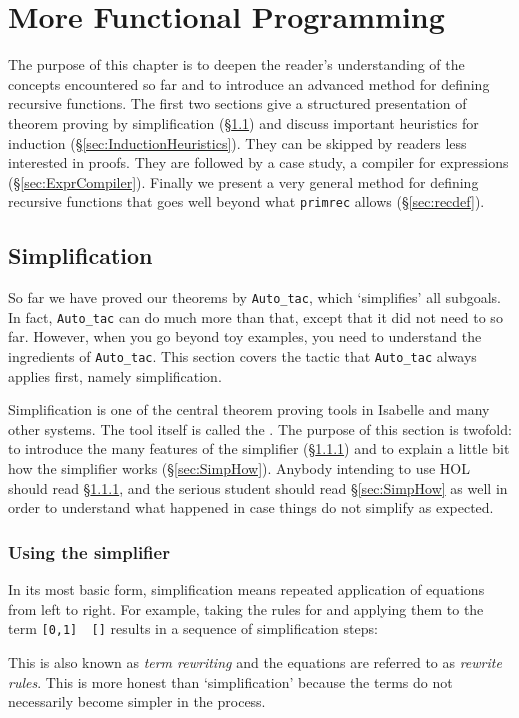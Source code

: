 \chapter{More Functional Programming}

The purpose of this chapter is to deepen the reader's understanding of the
concepts encountered so far and to introduce an advanced method for defining
recursive functions. The first two sections give a structured presentation of
theorem proving by simplification (\S\ref{sec:Simplification}) and
discuss important heuristics for induction (\S\ref{sec:InductionHeuristics}). They
can be skipped by readers less interested in proofs. They are followed by a
case study, a compiler for expressions (\S\ref{sec:ExprCompiler}).
Finally we present a very general method for defining recursive functions
that goes well beyond what \texttt{primrec} allows (\S\ref{sec:recdef}).


\section{Simplification}
\label{sec:Simplification}

So far we have proved our theorems by \texttt{Auto_tac}, which
`simplifies' all subgoals. In fact, \texttt{Auto_tac} can do much more than
that, except that it did not need to so far. However, when you go beyond toy
examples, you need to understand the ingredients of \texttt{Auto_tac}.
This section covers the tactic that \texttt{Auto_tac} always applies first,
namely simplification.

Simplification is one of the central theorem proving tools in Isabelle and
many other systems. The tool itself is called the . The
purpose of this section is twofold: to introduce the many features of the
simplifier (\S\ref{sec:SimpFeatures}) and to explain a little bit how the
simplifier works (\S\ref{sec:SimpHow}).  Anybody intending to use HOL should
read \S\ref{sec:SimpFeatures}, and the serious student should read
\S\ref{sec:SimpHow} as well in order to understand what happened in case
things do not simplify as expected.


\subsection{Using the simplifier}
\label{sec:SimpFeatures}

In its most basic form, simplification means repeated application of
equations from left to right. For example, taking the rules for \texttt{\at}
and applying them to the term \texttt{[0,1] \at\ []} results in a sequence of
simplification steps:
This is also known as {\em term rewriting} and the equations are referred
to as {\em rewrite rules}. This is more honest than `simplification' because
the terms do not necessarily become simpler in the process.

